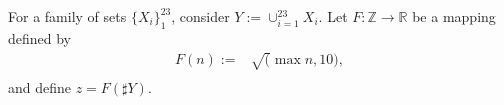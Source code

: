 \documentclass[varwidth=9cm]{standalone}
\begin{document}
For a family of sets $\{X_i\}_1^23$, consider $Y := \cup_{i=1}^23 X_i$.
Let $F: \mathbb{Z} \to \mathbb{R}$ be a mapping defined by
\begin{align}
    F(n) := & \sqrt( \max{ n, 10 } ),\\
\end{align}
and define $z=F(\sharp Y)$.
\end{document}
